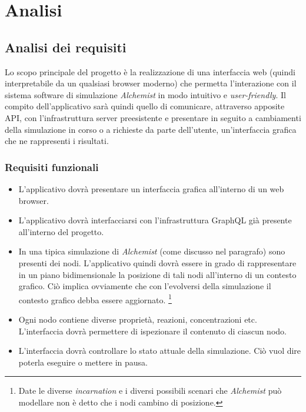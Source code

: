\chapter{Analisi}

\section{Analisi dei requisiti}

Lo scopo principale del progetto è la realizzazione di una interfaccia web (quindi interpretabile da un qualsiasi browser moderno) che permetta l'interazione con il sistema software di simulazione
\textit{Alchemist} in modo intuitivo e \textit{user-friendly}. Il compito dell'applicativo sarà quindi quello di comunicare, attraverso apposite \ac{API}, con l'infrastruttura server preesistente e presentare in seguito a cambiamenti della simulazione in corso o a richieste da parte dell'utente, un'interfaccia grafica che ne rappresenti i risultati.
\subsection{Requisiti funzionali}
\begin{itemize}
	\item L'applicativo dovrà presentare un interfaccia grafica all'interno di un web browser.
	\item L'applicativo dovrà interfacciarsi con l'infrastruttura GraphQL già presente all'interno del progetto.
	\item In una tipica simulazione di \textit{Alchemist} (come discusso nel paragrafo) sono presenti dei nodi. L'applicativo quindi dovrà essere in grado di rappresentare in un piano bidimensionale la posizione di tali nodi all'interno di un contesto grafico. Ciò implica ovviamente che con l'evolversi della simulazione il contesto grafico debba essere aggiornato. \footnote{Date le diverse \textit{incarnation} e i diversi possibili scenari che \textit{Alchemist} può modellare non è detto che i nodi cambino di posizione.}
	\item Ogni nodo contiene diverse proprietà, reazioni, concentrazioni etc. L'interfaccia dovrà permettere di ispezionare il contenuto di ciascun nodo. 
	\item L'interfaccia dovrà controllare lo stato attuale della simulazione. Ciò vuol dire poterla eseguire o mettere in pausa.
\end{itemize}

